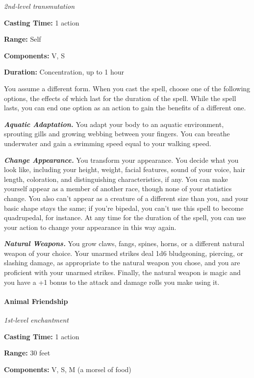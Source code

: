 \documentclass[
]{article}
\begin{document}
\emph{2nd-level transmutation}

\textbf{Casting Time:} 1 action

\textbf{Range:} Self

\textbf{Components:} V, S

\textbf{Duration:} Concentration, up to 1 hour

You assume a different form. When you cast the spell, choose one of the
following options, the effects of which last for the duration of the
spell. While the spell lasts, you can end one option as an action to
gain the benefits of a different one.

\emph{\textbf{Aquatic Adaptation.}} You adapt your body to an aquatic
environment, sprouting gills and growing webbing between your fingers.
You can breathe underwater and gain a swimming speed equal to your
walking speed.

\emph{\textbf{Change Appearance.}} You transform your appearance. You
decide what you look like, including your height, weight, facial
features, sound of your voice, hair length, coloration, and
distinguishing characteristics, if any. You can make yourself appear as
a member of another race, though none of your statistics change. You
also can't appear as a creature of a different size than you, and your
basic shape stays the same; if you're bipedal, you can't use this spell
to become quadrupedal, for instance. At any time for the duration of the
spell, you can use your action to change your appearance in this way
again.

\emph{\textbf{Natural Weapons.}} You grow claws, fangs, spines, horns,
or a different natural weapon of your choice. Your unarmed strikes deal
1d6 bludgeoning, piercing, or slashing damage, as appropriate to the
natural weapon you chose, and you are proficient with your unarmed
strikes. Finally, the natural weapon is magic and you have a +1 bonus to
the attack and damage rolls you make using it.

\hypertarget{animal-friendship}{%
\paragraph{Animal Friendship}\label{animal-friendship}}

\emph{1st-level enchantment}

\textbf{Casting Time:} 1 action

\textbf{Range:} 30 feet

\textbf{Components:} V, S, M (a morsel of food)
\end{document}
